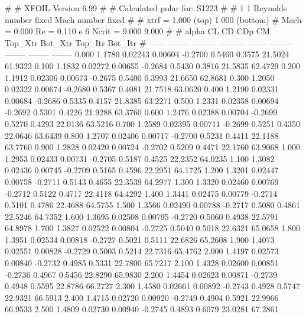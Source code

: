 #  
#       XFOIL         Version 6.99
#  
# Calculated polar for: S1223                                           
#  
# 1 1 Reynolds number fixed          Mach number fixed         
#  
# xtrf =   1.000 (top)        1.000 (bottom)  
# Mach =   0.000     Re =     0.110 e 6     Ncrit =   9.000  9.000
#  
#   alpha    CL        CD       CDp       CM     Top_Xtr  Bot_Xtr  Top_Itr  Bot_Itr
#  ------ -------- --------- --------- -------- -------- -------- -------- --------
   0.000   1.1780   0.02243   0.00604  -0.2700   0.5460   0.3575  21.5024  61.9322
   0.100   1.1832   0.02272   0.00655  -0.2684   0.5430   0.3816  21.5835  62.4729
   0.200   1.1912   0.02306   0.00673  -0.2675   0.5400   0.3993  21.6650  62.8681
   0.300   1.2050   0.02322   0.00674  -0.2680   0.5367   0.4081  21.7518  63.0620
   0.400   1.2190   0.02331   0.00684  -0.2686   0.5335   0.4157  21.8385  63.2271
   0.500   1.2331   0.02358   0.00694  -0.2692   0.5301   0.4226  21.9288  63.3760
   0.600   1.2476   0.02388   0.00704  -0.2699   0.5270   0.4293  22.0136  63.5216
   0.700   1.2589   0.02395   0.00711  -0.2699   0.5251   0.4350  22.0646  63.6439
   0.800   1.2707   0.02406   0.00717  -0.2700   0.5231   0.4411  22.1188  63.7760
   0.900   1.2828   0.02420   0.00724  -0.2702   0.5209   0.4471  22.1760  63.9068
   1.000   1.2953   0.02433   0.00731  -0.2705   0.5187   0.4525  22.2352  64.0235
   1.100   1.3082   0.02436   0.00745  -0.2709   0.5165   0.4596  22.2951  64.1725
   1.200   1.3201   0.02447   0.00758  -0.2711   0.5143   0.4655  22.3539  64.2977
   1.300   1.3320   0.02460   0.00769  -0.2712   0.5122   0.4717  22.4118  64.4292
   1.400   1.3441   0.02475   0.00779  -0.2714   0.5101   0.4786  22.4688  64.5755
   1.500   1.3566   0.02490   0.00788  -0.2717   0.5080   0.4861  22.5246  64.7352
   1.600   1.3695   0.02508   0.00795  -0.2720   0.5060   0.4938  22.5791  64.8978
   1.700   1.3827   0.02522   0.00804  -0.2725   0.5040   0.5018  22.6321  65.0658
   1.800   1.3951   0.02534   0.00818  -0.2727   0.5021   0.5111  22.6826  65.2608
   1.900   1.4073   0.02551   0.00828  -0.2729   0.5003   0.5214  22.7316  65.4762
   2.000   1.4197   0.02573   0.00840  -0.2732   0.4985   0.5331  22.7800  65.7217
   2.100   1.4328   0.02600   0.00851  -0.2736   0.4967   0.5456  22.8290  65.9830
   2.200   1.4454   0.02623   0.00871  -0.2739   0.4948   0.5595  22.8786  66.2727
   2.300   1.4580   0.02661   0.00892  -0.2743   0.4928   0.5747  22.9321  66.5913
   2.400   1.4715   0.02720   0.00920  -0.2749   0.4904   0.5921  22.9966  66.9533
   2.500   1.4809   0.02730   0.00940  -0.2745   0.4893   0.6079  23.0281  67.2861
